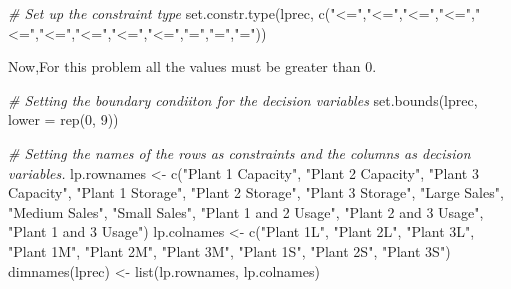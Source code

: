 \documentclass[
]{article}
\newenvironment{Shaded}{\begin{snugshade}}{\end{snugshade}}
\newcommand{\AttributeTok}[1]{\textcolor[rgb]{0.77,0.63,0.00}{#1}}
\newcommand{\CommentTok}[1]{\textcolor[rgb]{0.56,0.35,0.01}{\textit{#1}}}
\newcommand{\DecValTok}[1]{\textcolor[rgb]{0.00,0.00,0.81}{#1}}
\newcommand{\FunctionTok}[1]{\textcolor[rgb]{0.00,0.00,0.00}{#1}}
\newcommand{\NormalTok}[1]{#1}
\newcommand{\OtherTok}[1]{\textcolor[rgb]{0.56,0.35,0.01}{#1}}
\newcommand{\StringTok}[1]{\textcolor[rgb]{0.31,0.60,0.02}{#1}}
\begin{document}
\begin{Shaded}
\begin{Highlighting}[]
\CommentTok{\# Set up the constraint type}
\FunctionTok{set.constr.type}\NormalTok{(lprec, }\FunctionTok{c}\NormalTok{(}\StringTok{"\textless{}="}\NormalTok{,}\StringTok{"\textless{}="}\NormalTok{,}\StringTok{"\textless{}="}\NormalTok{,}\StringTok{"\textless{}="}\NormalTok{,}\StringTok{"\textless{}="}\NormalTok{,}\StringTok{"\textless{}="}\NormalTok{,}\StringTok{"\textless{}="}\NormalTok{,}\StringTok{"\textless{}="}\NormalTok{,}\StringTok{"\textless{}="}\NormalTok{,}\StringTok{"="}\NormalTok{,}\StringTok{"="}\NormalTok{,}\StringTok{"="}\NormalTok{))}
\end{Highlighting}
\end{Shaded}

Now,For this problem all the values must be greater than 0.

\begin{Shaded}
\begin{Highlighting}[]
\CommentTok{\# Setting the boundary condiiton for the decision variables}
\FunctionTok{set.bounds}\NormalTok{(lprec, }\AttributeTok{lower =} \FunctionTok{rep}\NormalTok{(}\DecValTok{0}\NormalTok{, }\DecValTok{9}\NormalTok{))}
\end{Highlighting}
\end{Shaded}

\begin{Shaded}
\begin{Highlighting}[]
\CommentTok{\# Setting the names of the rows as constraints and the columns as decision variables.}
\NormalTok{lp.rownames }\OtherTok{\textless{}{-}} \FunctionTok{c}\NormalTok{(}\StringTok{"Plant 1 Capacity"}\NormalTok{, }\StringTok{"Plant 2 Capacity"}\NormalTok{, }\StringTok{"Plant 3 Capacity"}\NormalTok{, }\StringTok{"Plant 1 Storage"}\NormalTok{, }\StringTok{"Plant 2 Storage"}\NormalTok{, }\StringTok{"Plant 3 Storage"}\NormalTok{, }\StringTok{"Large Sales"}\NormalTok{, }\StringTok{"Medium Sales"}\NormalTok{, }\StringTok{"Small Sales"}\NormalTok{, }\StringTok{"Plant 1 and 2 Usage"}\NormalTok{, }\StringTok{"Plant 2 and 3 Usage"}\NormalTok{, }\StringTok{"Plant 1 and 3 Usage"}\NormalTok{)}
\NormalTok{lp.colnames }\OtherTok{\textless{}{-}} \FunctionTok{c}\NormalTok{(}\StringTok{"Plant 1L"}\NormalTok{, }\StringTok{"Plant 2L"}\NormalTok{, }\StringTok{"Plant 3L"}\NormalTok{, }\StringTok{"Plant 1M"}\NormalTok{, }\StringTok{"Plant 2M"}\NormalTok{, }\StringTok{"Plant 3M"}\NormalTok{, }\StringTok{"Plant 1S"}\NormalTok{, }\StringTok{"Plant 2S"}\NormalTok{, }\StringTok{"Plant 3S"}\NormalTok{)}
\FunctionTok{dimnames}\NormalTok{(lprec) }\OtherTok{\textless{}{-}} \FunctionTok{list}\NormalTok{(lp.rownames, lp.colnames)}
\end{Highlighting}
\end{Shaded}
\end{document}
